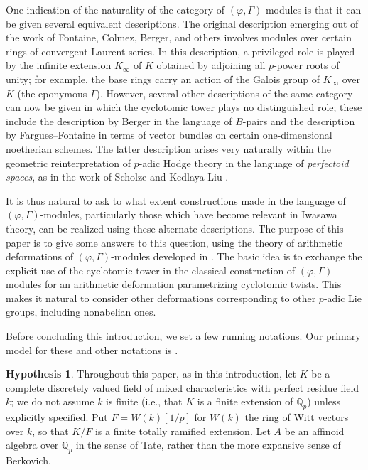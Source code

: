 \documentclass[12pt]{amsart}
\theoremstyle{definition}
\newtheorem{hypothesis}[theorem]{Hypothesis}
\numberwithin{equation}{theorem}
\newcommand{\QQ}{\mathbb{Q}}
\begin{document}
One indication of the naturality of the category of $(\varphi, \Gamma)$-modules is that it can be given several equivalent descriptions. The original description emerging out of the work of Fontaine, Colmez, Berger, and others involves modules over certain rings of convergent Laurent series. In this description, a privileged role is played by the infinite extension $K_\infty$ of $K$ obtained by adjoining all $p$-power roots of unity; for example, the base rings carry an action of the Galois group of $K_\infty$ over $K$ (the eponymous $\Gamma$). However, several other descriptions of the same category can now be given in which the cyclotomic tower plays no distinguished role; these include the description by Berger in the language of $B$-pairs and the description by Fargues--Fontaine in terms of vector bundles on certain one-dimensional noetherian schemes. The latter description arises very naturally within the geometric reinterpretation of $p$-adic Hodge theory in the language of \emph{perfectoid spaces}, as in the work of Scholze \cite{scholze1, scholze2, scholze-icm} and Kedlaya-Liu \cite{kedlaya-liu1, kedlaya-liu2}.

It is thus natural to ask to what extent constructions made in the language of $(\varphi, \Gamma)$-modules, particularly those which have become relevant in Iwasawa theory, can be realized using these alternate descriptions. The purpose of this paper is to give some answers to this question, using the theory of arithmetic deformations of $(\varphi, \Gamma)$-modules developed in \cite{kpx}. The basic idea is to exchange the explicit use of the cyclotomic tower in the classical construction of $(\varphi, \Gamma)$-modules for an arithmetic deformation parametrizing cyclotomic twists. This makes it natural to consider other deformations corresponding to other $p$-adic Lie groups, including nonabelian ones.

Before concluding this introduction, we set a few running notations. Our primary model for these and other notations is \cite{kpx}.
\setcounter{theorem}{0}
\begin{hypothesis}
Throughout this paper, as in this introduction, let $K$ be a complete discretely valued field of mixed characteristics with perfect residue field $k$; we do not assume $k$ is finite (i.e., that $K$ is a finite extension of $\QQ_p$) unless explicitly specified.
Put $F = W(k)[1/p]$ for $W(k)$ the ring of Witt vectors over $k$, so that $K/F$ is a finite totally ramified extension.
Let $A$ be an affinoid algebra over $\QQ_p$ in the sense of Tate, rather than the more expansive sense of Berkovich. 
\end{hypothesis}
\end{document}
